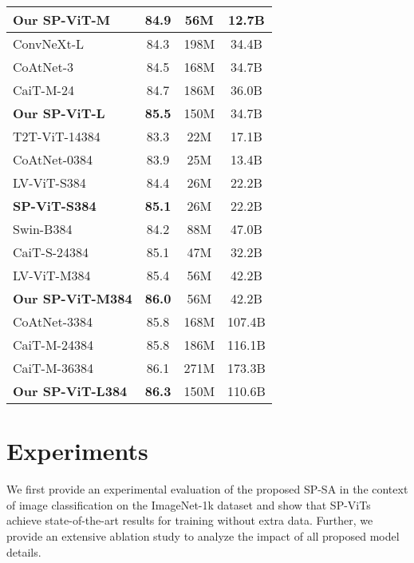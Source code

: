 \documentclass[authorversion, sigconf, acmthm=false, nonacm=true]{acmart}
\begin{document}
\begin{table}[h]
\begin{tabular}{lccc}
                
\textbf{Our SP-ViT-M} & \textbf{84.9} & 56M  & 12.7B \\
              \midrule
                    ConvNeXt-L \cite{liu2022convnet} & 84.3 & 198M & 34.4B \\
            CoAtNet-3 \cite{dai2021coatnet} & 84.5 & 168M & 34.7B \\ 
           CaiT-M-24 \cite{touvron2021going}& 84.7 & 186M & 36.0B \\
    
           \textbf{Our SP-ViT-L} &  \textbf{85.5}& 150M  & 34.7B  \\ 
          
        \midrule
        T2T-ViT-14384 \cite{yuan2021tokens} & 83.3 & 22M & 17.1B  \\
        CoAtNet-0384 \cite{dai2021coatnet} & 83.9 & 25M & 13.4B \\
       LV-ViT-S384 \cite{jiang2021all} & 84.4 & 26M & 22.2B \\
            \textbf{SP-ViT-S384}  & \textbf{85.1} & 26M & 22.2B \\
        \midrule 
      Swin-B384  \cite{liu2021swin}& 84.2 & 88M& 47.0B \\
            

           CaiT-S-24384 \cite{touvron2021going}&85.1 &47M & 32.2B \\
           LV-ViT-M384 \cite{jiang2021all} & 85.4& 56M & 42.2B \\
\textbf{Our SP-ViT-M384} &  \textbf{86.0}& 56M & 42.2B \\
            
           \midrule
           CoAtNet-3384 \cite{dai2021coatnet} & 85.8 & 168M & 107.4B \\
            CaiT-M-24384 \cite{touvron2021going}&85.8 &186M & 116.1B \\
            CaiT-M-36384 \cite{touvron2021going} & 86.1 & 271M & 173.3B \\ 
           \textbf{Our SP-ViT-L384}  &  \textbf{86.3} & 150M  & 110.6B \\ 
           \bottomrule
        \end{tabular}
\label{table4}
        \end{table}
        
\section{Experiments}
We first provide an experimental evaluation of the proposed SP-SA in the context of image classification on the ImageNet-1k dataset and show that SP-ViTs achieve state-of-the-art results for training without extra data. Further, we provide an extensive ablation study to analyze the impact of all proposed model details.
\end{document}
